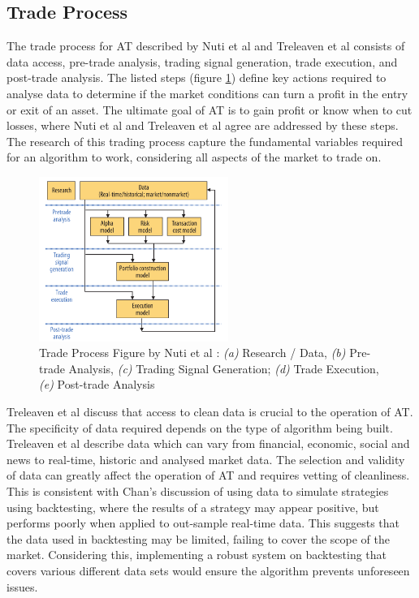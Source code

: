 \subsection{Trade Process}
\label{sec:related:algoTrading:tradeprocess}
The trade process for AT described by Nuti et al \cite{ART:Nuti:2011} and Treleaven et al  \cite{ART:Treleaven:2013} consists of data access, pre-trade analysis, trading signal generation, trade execution, and post-trade analysis. The listed steps (figure \ref{fig:related:tradeprocess}) define key actions required to analyse data to determine if the market conditions can turn a profit in the entry or exit of an asset. The ultimate goal of AT is to gain profit or know when to cut losses, where Nuti et al \cite{ART:Nuti:2011} and Treleaven et al  \cite{ART:Treleaven:2013} agree are addressed by these steps. The research of this trading process capture the fundamental variables required for an algorithm to work, considering all aspects of the market to trade on.

\begin{figure}[htb]
    \centering
	\includegraphics[width=0.55\textwidth]{content/graphics/AT-trade_process}
	\caption{Trade Process Figure by Nuti et al \cite{ART:Nuti:2011}: \textit{(a)} Research / Data, \textit{(b)} Pre-trade Analysis, \textit{(c)} Trading Signal Generation; \textit{(d)} Trade Execution, \textit{(e)} Post-trade Analysis }
	\label{fig:related:tradeprocess}
\end{figure}

Treleaven et al \cite{ART:Treleaven:2013} discuss that access to clean data is crucial to the operation of AT. The specificity of data required depends on the type of algorithm being built. Treleaven et al describe data which can vary from financial, economic, social and news to real-time, historic and analysed market data. The selection and validity of data can greatly affect the operation of AT and requires vetting of cleanliness. This is consistent with Chan's \cite{BOOK:Chan:2013}  discussion of using data to simulate strategies using backtesting, where the results of a strategy may appear positive, but performs poorly when applied to out-sample real-time data. This suggests that the data used in backtesting may be limited, failing to cover the scope of the market. Considering this, implementing a robust system on backtesting that covers various different data sets would ensure the algorithm prevents unforeseen issues.

